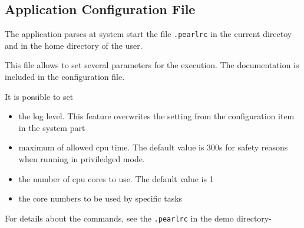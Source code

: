 \subsection{Application Configuration File}

The application parses at system start the file \texttt{.pearlrc} in
the current directoy and in the home directory of the user.

This file allows to set several parameters for the execution.
The documentation is included in the configuration file.

It is possible to set
\begin{itemize}
\item the log level. This feature overwrites the setting 
   from the configuration item in the system part
\item maximum of allowed cpu time. The default value is 300s for safety reasons 
   when running in priviledged mode.
\item the number of cpu cores to use. The default value is 1
\item the core numbers to be used by specific tasks
\end{itemize}

For details about the commands, see the \texttt{.pearlrc} in the demo directory-


